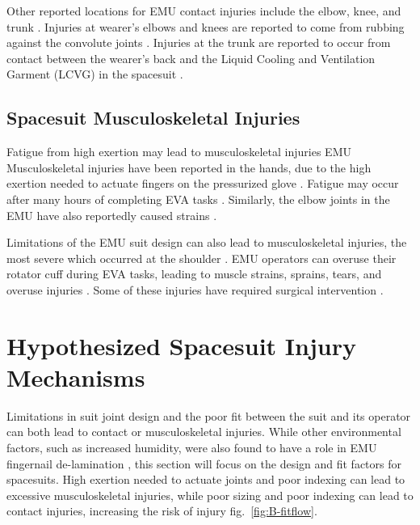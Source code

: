 \documentclass[defaultstyle,11pt]{comps}
\begin{document}
Other reported locations for EMU contact injuries include the elbow, knee, and trunk \citep{Strauss2004, Scheuring2012}.
Injuries at wearer's elbows and knees are reported to come from rubbing against the convolute joints \citep{Strauss2004}.
Injuries at the trunk are reported to occur from contact between the wearer's back and the Liquid Cooling and Ventilation Garment (LCVG) in the spacesuit \citep{Strauss2004}.

\hypertarget{spacesuit-musculoskeletal-injuries}{%
\subsection{Spacesuit Musculoskeletal Injuries}\label{spacesuit-musculoskeletal-injuries}}

Fatigue from high exertion may lead to musculoskeletal injuries
EMU Musculoskeletal injuries have been reported in the hands, due to the high exertion needed to actuate fingers on the pressurized glove \citep{Viegas2004}.
Fatigue may occur after many hours of completing EVA tasks \citep{Strauss2004, Scheuring2012}.
Similarly, the elbow joints in the EMU have also reportedly caused strains \citep{Strauss2004}.

Limitations of the EMU suit design can also lead to musculoskeletal injuries, the most severe which occurred at the shoulder \citep{Strauss2004}.
EMU operators can overuse their rotator cuff during EVA tasks, leading to muscle strains, sprains, tears, and overuse injuries \citep{Williams2003, Strauss2004, Strauss2005, Scheuring2012}.
Some of these injuries have required surgical intervention \citep{Strauss2005}.

\hypertarget{hypothesized-spacesuit-injury-mechanisms}{%
\section{Hypothesized Spacesuit Injury Mechanisms}\label{hypothesized-spacesuit-injury-mechanisms}}

Limitations in suit joint design and the poor fit between the suit and its operator can both lead to contact or musculoskeletal injuries.
While other environmental factors, such as increased humidity, were also found to have a role in EMU fingernail de-lamination \citep{Chappell2017}, this section will focus on the design and fit factors for spacesuits.
High exertion needed to actuate joints and poor indexing can lead to excessive musculoskeletal injuries, while poor sizing and poor indexing can lead to contact injuries, increasing the risk of injury fig.~\ref{fig:B-fitflow}.
\end{document}
